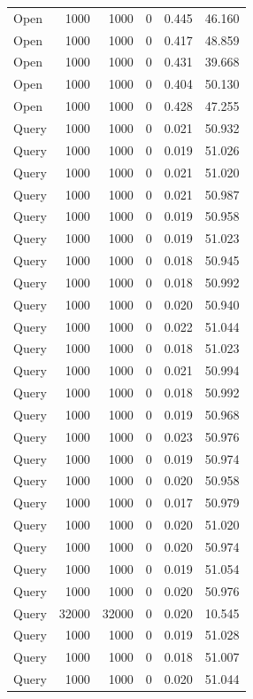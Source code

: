 \begin{table}
\begin{tabular}{lrrrrr}
Open & 1000 & 1000 & 0 & 0.445 & 46.160 \\
Open & 1000 & 1000 & 0 & 0.417 & 48.859 \\
Open & 1000 & 1000 & 0 & 0.431 & 39.668 \\
Open & 1000 & 1000 & 0 & 0.404 & 50.130 \\
Open & 1000 & 1000 & 0 & 0.428 & 47.255 \\
Query & 1000 & 1000 & 0 & 0.021 & 50.932 \\
Query & 1000 & 1000 & 0 & 0.019 & 51.026 \\
Query & 1000 & 1000 & 0 & 0.021 & 51.020 \\
Query & 1000 & 1000 & 0 & 0.021 & 50.987 \\
Query & 1000 & 1000 & 0 & 0.019 & 50.958 \\
Query & 1000 & 1000 & 0 & 0.019 & 51.023 \\
Query & 1000 & 1000 & 0 & 0.018 & 50.945 \\
Query & 1000 & 1000 & 0 & 0.018 & 50.992 \\
Query & 1000 & 1000 & 0 & 0.020 & 50.940 \\
Query & 1000 & 1000 & 0 & 0.022 & 51.044 \\
Query & 1000 & 1000 & 0 & 0.018 & 51.023 \\
Query & 1000 & 1000 & 0 & 0.021 & 50.994 \\
Query & 1000 & 1000 & 0 & 0.018 & 50.992 \\
Query & 1000 & 1000 & 0 & 0.019 & 50.968 \\
Query & 1000 & 1000 & 0 & 0.023 & 50.976 \\
Query & 1000 & 1000 & 0 & 0.019 & 50.974 \\
Query & 1000 & 1000 & 0 & 0.020 & 50.958 \\
Query & 1000 & 1000 & 0 & 0.017 & 50.979 \\
Query & 1000 & 1000 & 0 & 0.020 & 51.020 \\
Query & 1000 & 1000 & 0 & 0.020 & 50.974 \\
Query & 1000 & 1000 & 0 & 0.019 & 51.054 \\
Query & 1000 & 1000 & 0 & 0.020 & 50.976 \\
Query & 32000 & 32000 & 0 & 0.020 & 10.545 \\
Query & 1000 & 1000 & 0 & 0.019 & 51.028 \\
Query & 1000 & 1000 & 0 & 0.018 & 51.007 \\
Query & 1000 & 1000 & 0 & 0.020 & 51.044 \\

\end{tabular}
\end{table}
